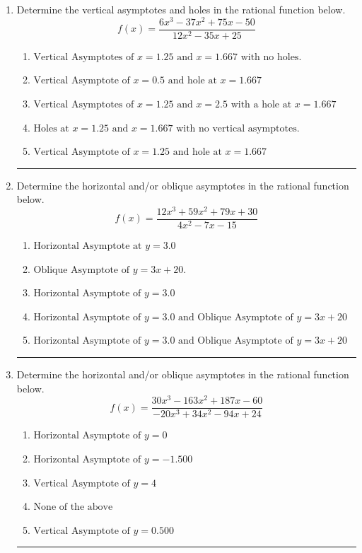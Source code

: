 \documentclass[14pt]{extbook}
\newcommand{\litem}[1]{\item#1\hspace*{-1cm}\rule{\textwidth}{0.4pt}}
\begin{document}
\begin{enumerate}
{\begin{enumerate}[label=\Alph*.]
\end{enumerate} }
\litem{
Determine the vertical asymptotes and holes in the rational function below.\[ f(x) = \frac{6x^{3} -37 x^{2} +75 x -50}{12x^{2} -35 x + 25} \]\begin{enumerate}[label=\Alph*.]
\item \( \text{Vertical Asymptotes of } x = 1.25 \text{ and } x = 1.667 \text{ with no holes.} \)
\item \( \text{Vertical Asymptote of } x = 0.5 \text{ and hole at } x = 1.667 \)
\item \( \text{Vertical Asymptotes of } x = 1.25 \text{ and } x = 2.5 \text{ with a hole at } x = 1.667 \)
\item \( \text{Holes at } x = 1.25 \text{ and } x = 1.667 \text{ with no vertical asymptotes.} \)
\item \( \text{Vertical Asymptote of } x = 1.25 \text{ and hole at } x = 1.667 \)

\end{enumerate} }
\litem{
Determine the horizontal and/or oblique asymptotes in the rational function below.\[ f(x) = \frac{12x^{3} +59 x^{2} +79 x + 30}{4x^{2} -7 x -15} \]\begin{enumerate}[label=\Alph*.]
\item \( \text{Horizontal Asymptote at } y = 3.0 \)
\item \( \text{Oblique Asymptote of } y = 3x + 20. \)
\item \( \text{Horizontal Asymptote of } y = 3.0  \)
\item \( \text{Horizontal Asymptote of } y = 3.0 \text{ and Oblique Asymptote of } y = 3x + 20 \)
\item \( \text{Horizontal Asymptote of } y = 3.0 \text{ and Oblique Asymptote of } y = 3x + 20 \)

\end{enumerate} }
\litem{
Determine the horizontal and/or oblique asymptotes in the rational function below.\[ f(x) = \frac{30x^{3} -163 x^{2} +187 x -60}{-20x^{3} +34 x^{2} -94 x + 24} \]\begin{enumerate}[label=\Alph*.]
\item \( \text{Horizontal Asymptote of } y = 0  \)
\item \( \text{Horizontal Asymptote of } y = -1.500  \)
\item \( \text{Vertical Asymptote of } y = 4  \)
\item \( \text{None of the above} \)
\item \( \text{Vertical Asymptote of } y = 0.500  \)


\end{enumerate}}
\end{enumerate}
\end{document}
